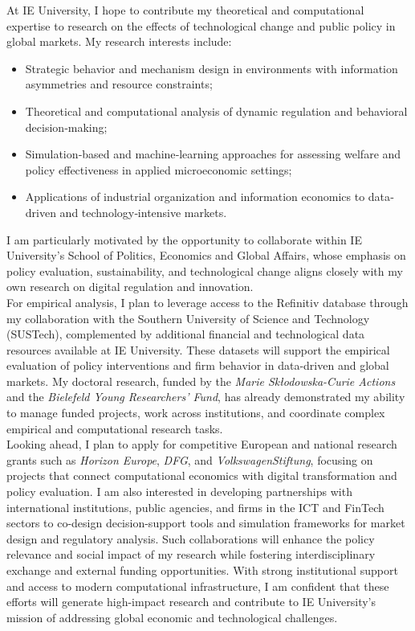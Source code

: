 \documentclass{nfr}
\begin{document}
At IE University, I hope to contribute my theoretical and computational expertise to research on the effects of technological change and public policy in global markets. 
My research interests include:
\begin{itemize}
    \item Strategic behavior and mechanism design in environments with information asymmetries and resource constraints;
    \item Theoretical and computational analysis of dynamic regulation and behavioral decision‐making;
    \item Simulation‐based and machine‐learning approaches for assessing welfare and policy effectiveness in applied microeconomic settings;
    \item Applications of industrial organization and information economics to data‐driven and technology‐intensive markets.
\end{itemize}
I am particularly motivated by the opportunity to collaborate within IE University’s School of Politics, Economics and Global Affairs, whose emphasis on policy evaluation, sustainability, and technological change aligns closely with my own research on digital regulation and innovation.\\

For empirical analysis, I plan to leverage access to the Refinitiv database through my collaboration with the Southern University of Science and Technology (SUSTech), complemented by additional financial and technological data resources available at IE University. 
These datasets will support the empirical evaluation of policy interventions and firm behavior in data-driven and global markets. 
My doctoral research, funded by the \textit{Marie Skłodowska-Curie Actions} and the \textit{Bielefeld Young Researchers’ Fund}, has already demonstrated my ability to manage funded projects, work across institutions, and coordinate complex empirical and computational research tasks.\\

Looking ahead, I plan to apply for competitive European and national research grants such as \textit{Horizon Europe}, \textit{DFG}, and \textit{VolkswagenStiftung}, focusing on projects that connect computational economics with digital transformation and policy evaluation. 
I am also interested in developing partnerships with international institutions, public agencies, and firms in the ICT and FinTech sectors to co-design decision-support tools and simulation frameworks for market design and regulatory analysis. 
Such collaborations will enhance the policy relevance and social impact of my research while fostering interdisciplinary exchange and external funding opportunities. 
With strong institutional support and access to modern computational infrastructure, I am confident that these efforts will generate high-impact research and contribute to IE University’s mission of addressing global economic and technological challenges.\\
\end{document}
